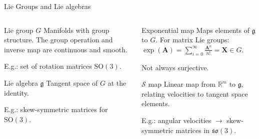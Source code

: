 \begin{frame}{Lie Groups and Lie algebras}
    \begin{columns}[c]
        \begin{column}{0.5\linewidth}
            \begin{exampleblock}{Lie group $G$}
                Manifolds with group structure. The group operation and inverse map are continuous and smooth.
                \linebreak

                E.g.: set of rotation matrices $\text{SO}(3)$.
            \end{exampleblock}
            \begin{exampleblock}{Lie algebra $\mathfrak{g}$}
                Tangent space of $G$ at the identity.
                \linebreak

                E.g.: skew-symmetric matrices for $\text{SO}(3)$.
            \end{exampleblock}
        \end{column}
        \begin{column}{0.5\linewidth}
            \begin{exampleblock}{Exponential map}
                Maps elements of $\mathfrak{g}$ to $G$. For matrix Lie groups: $\exp(\mathbf{A})=\sum_{i=0}^\infty \frac{\mathbf{A}^n}{n!} = \mathbf{X} \in G$.

                Not always surjective.
            \end{exampleblock}
            \begin{exampleblock}{$\mathcal{S}$ map}
                Linear map from $\mathbb{R}^m$ to $\mathfrak{g}$, relating velocities to tangent space elements.
                \linebreak

                E.g.: angular velocities $\to$ skew-symmetric matrices in $\mathfrak{so}(3)$.
            \end{exampleblock}    
        \end{column}
    \end{columns}
\end{frame}
